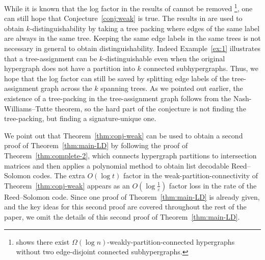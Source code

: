 \documentclass[11pt]{article}
\begin{document}
While it is known that the log factor in the results of \cite{CS07,CCV09} cannot be removed \cite{BT03}\footnote{\cite{BT03} shows there exist $\Omega(\log n)$-weakly-partition-connected hypergraphs without two edge-disjoint connected subhypergraphs.}, one can still hope that Conjecture~\ref{conj:weak} is true.
The results in \cite{CS07, CCV09} are used to obtain $k$-distinguishability by taking a tree packing where edges of the same label are always in the same tree.
Keeping the same edge labels in the same trees is not necessary in general to obtain distinguishability.
Indeed Example~\ref{ex:1} illustrates that a tree-assignment can be $k$-distinguishable even when the original hypergraph does not have a partition into $k$ connected subhypergraphs.
Thus, we hope that the log factor can still be saved by splitting edge labels of the tree-assignment graph across the $k$ spanning trees.
As we pointed out earlier, the existence of a tree-packing in the tree-assignment graph follows from the Nash-Williams--Tutte theorem, so the hard part of the conjecture is not finding the tree-packing, but finding a signature-unique one.

We point out that Theorem~\ref{thm:conj-weak} can be used to obtain a second proof of Theorem~\ref{thm:main-LD} by following the proof of Theorem~\ref{thm:complete-2}, which connects hypergraph partitions to intersection matrices and then applies a polynomial method to obtain list decodable Reed--Solomon codes.
The extra $O(\log t)$ factor in the weak-partition-connectivity of Theorem~\ref{thm:conj-weak} appears as an $O(\log\frac{1}{\varepsilon})$ factor loss in the rate of the Reed--Solomon code.
Since one proof of Theorem~\ref{thm:main-LD} is already given, and the key ideas for this second proof are covered throughout the rest of the paper, we omit the details of this second proof of Theorem~\ref{thm:main-LD}.
\end{document}
